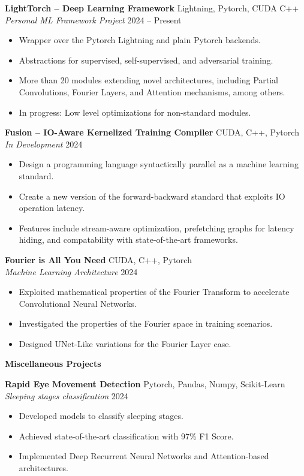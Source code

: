 \documentclass[11pt]{article}
\begin{document}
\textbf{LightTorch – Deep Learning Framework} \hfill Lightning, Pytorch, CUDA C++ \\
\textit{Personal ML Framework Project} \hfill 2024 – Present
\begin{itemize}[noitemsep]
    \item Wrapper over the Pytorch Lightning and plain Pytorch backends.
    \item Abstractions for supervised, self-supervised, and adversarial training.
    \item More than 20 modules extending novel architectures, including Partial Convolutions, Fourier Layers, and Attention mechanisms, among others.
    \item In progress: Low level optimizations for non-standard modules.
\end{itemize}

\textbf{Fusion – IO-Aware Kernelized Training Compiler} \hfill CUDA, C++, Pytorch\\
\textit{In Development} \hfill 2024
\begin{itemize}[noitemsep]
    \item Design a programming language syntactically parallel as a machine learning standard.
    \item Create a new version of the forward-backward standard that exploits IO operation latency.
    \item Features include stream-aware optimization, prefetching graphs for latency hiding, and compatability with state-of-the-art frameworks.
\end{itemize}

\textbf{Fourier is All You Need} \hfill CUDA, C++, Pytorch \\
\textit{Machine Learning Architecture} \hfill 2024
\begin{itemize}[noitemsep]
    \item Exploited mathematical properties of the Fourier Transform to accelerate Convolutional Neural Networks.
    \item Investigated the properties of the Fourier space in training scenarios.
    \item Designed UNet-Like variations for the Fourier Layer case.
\end{itemize}

\begin{center}
    \textbf{Miscellaneous Projects}
\end{center}

\textbf{Rapid Eye Movement Detection} \hfill Pytorch, Pandas, Numpy, Scikit-Learn \\
\textit{Sleeping stages classification} \hfill 2024
\begin{itemize}[noitemsep]
    \item Developed models to classify sleeping stages.
    \item Achieved state-of-the-art classification with 97\% F1 Score.
    \item Implemented Deep Recurrent Neural Networks and Attention-based architectures.
\end{itemize}
\end{document}
